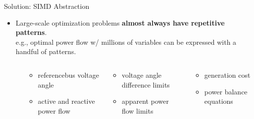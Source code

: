 \begin{frame}{Solution: SIMD Abstraction}
  \begin{itemize}
  \item<1-> Large-scale optimization problems {\bf almost always have repetitive patterns}.\\
    e.g., optimal power flow w/ millions of variables can be expressed with a handful of patterns.
    \vspace{-.15in}
    \begin{columns}[t]
      \footnotesize
      \begin{column}{0\textwidth}
      \end{column}
      \begin{column}{.3\textwidth}
        \begin{itemize}
        \item referencebus voltage angle
          \vspace{-.05in}
        \item active and reactive power flow
        \end{itemize}
      \end{column}
      \begin{column}{.3\textwidth}        
        \begin{itemize}
        \item voltage angle difference limits
          \vspace{-.05in}
        \item apparent power flow limits
        \end{itemize}
      \end{column}
      \begin{column}{.3\textwidth}        
        \begin{itemize}
        \item generation cost
          \vspace{-.05in}
        \item power balance equations
        \end{itemize}
      \end{column}
    \end{columns}
\end{itemize}
\end{frame}

